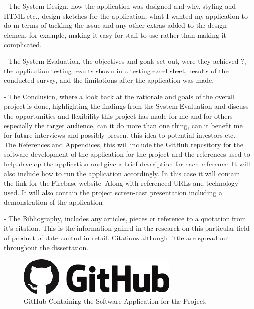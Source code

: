 - The System Design, how the application was designed and why, styling and HTML etc., design sketches for the application, what I wanted my application to do in terms of tackling the issue and any other extras added to the design element for example, making it easy for staff to use rather than making it complicated.
\newline

- The System Evaluation, the objectives and goals set out, were they achieved ?, the application testing results shown in a testing excel sheet, results of the conducted survey, and the limitations after the application was made.
\newline

- The Conclusion, where a look back at the rationale and goals of the overall project is done, highlighting the findings from the System Evaluation and discuss the opportunities and flexibility this project has made for me and for others especially the target audience, can it do more than one thing, can it benefit me for future interviews and possibly present this idea to potential investors etc.
\newline
\newpage
- The References and Appendices, this will include the GitHub repository for the software development of the application for the project and the references used to help develop the application and give a brief description for each reference. It will also include how to run the application accordingly. In this case it will contain the link for the Firebase website. Along with referenced URLs and technology used. It will also contain the project screen-cast presentation including a demonstration of the application.
\newline

- The Bibliography, includes any articles, pieces or reference to a quotation from it's citation. This is the information gained in the research on this particular field of product of date control in retail. Citations although little are spread out throughout the dissertation.

\begin{figure}[h!]
	\caption{GitHub Containing the Software Application for the Project.}
	\label{image:github}
	\centering
	\includegraphics[width=0.7\textwidth]{images/github.png}
\end{figure}

